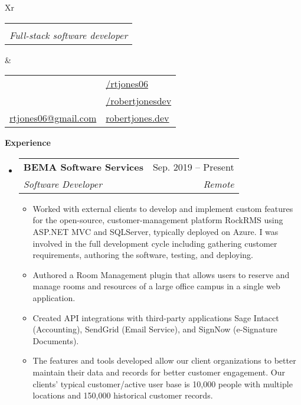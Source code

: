 \documentclass[letterpaper,11.5pt]{article}[leftmargin=*]
\makeatletter
\def \fullname {Robert Jones}
\def \subtitle {Full-stack software developer}
\def \locationicon {\faGlobe}
\def \locationtext {Salt Lake City, Utah}
\def \linkedinicon {\faLinkedin}
\def \linkedinlink {https://linkedin.com/in/rtjones06/}
\def \linkedintext {/rtjones06}
\def \phoneicon {\faPhone}
\def \phonetext {(713) 408-4485}
\def \emailicon {\faEnvelope}
\def \emaillink {mailto:rtjones06@gmail.com}
\def \emailtext {rtjones06@gmail.com}
\def \githubicon {\faGithub}
\def \githublink {https://github.com/robertjonesdev}
\def \githubtext {/robertjonesdev}
\def \websiteicon {\faGlobe}
\def \websitelink {https://robertjones.dev/}
\def \websitetext {robertjones.dev}
\def \headertype {\doublecol} %
\def \entryspacing {-0pt}
\def \linkedin {\linkedinicon \hspace{3pt}\href{\linkedinlink}{\linkedintext}}
\def \phone {\phoneicon \hspace{3pt}{ \phonetext}}
\def \location {\locationicon \hspace{3pt}{ \locationtext }}
\def \email {\emailicon \hspace{3pt}\href{\emaillink}{\emailtext}}
\def \github {\githubicon \hspace{3pt}\href{\githublink}{\githubtext}}
\def \website {\websiteicon \hspace{3pt}\href{\websitelink}{\websitetext}}
\renewcommand{\section}[2]{\vspace{5pt}
  \colorbox{secondary}{\color{white}\raggedbottom\normalsize\textbf{{#1}{\hspace{7pt}#2}}}
}
\newcommand{\resumeEntryStart}{\begin{itemize}[leftmargin=2.5mm]}
\newcommand{\resumeEntryEnd}{\end{itemize}\vspace{\entryspacing}}
\newcommand{\resumeItemListStart}{\begin{itemize}[leftmargin=4.5mm]}
\newcommand{\resumeItemListEnd}{\end{itemize}}
\newcommand{\resumeItem}[1]{
  \item\small{
    {#1 \vspace{-2pt}}
  }
}
\newcommand{\resumeEntryTSDL}[4]{
  \vspace{-1pt}\item[]
    \begin{tabularx}{0.97\textwidth}{X@{\hspace{60pt}}r}
      \textbf{\color{primary}#1} & {\firabook\color{accent}\small#2} \\
      \textit{\color{accent}\small#3} & \textit{\color{accent}\small#4} \\
    \end{tabularx}\vspace{-6pt}
}
\newcommand{\resumeEntryS}[2]{
  \item[]\small{
    \textbf{\color{primary}#1 }{ #2 \vspace{-6pt}}
  }
}
\newcommand{\doublecol}[6]{
  \begin{tabularx}{\textwidth}{Xr}
    {
      \begin{tabular}[c]{l}
        \fontsize{35}{45}\selectfont{\color{primary}{{\textbf{\fullname}}}} \\
        {\textit{\subtitle}} %
      \end{tabular}
    } & {
      \begin{tabular}[c]{l@{\hspace{1.5em}}l}
        {\small#4} & {\small#1} \\
        {\small#5} & {\small#2} \\
        {\small#6} & {\small#3}
      \end{tabular}
    }
  \end{tabularx}
}
\newcommand{\singlecol}[6]{
  \begin{tabularx}{\textwidth}{Xr}
    {
      \begin{tabular}[b]{l}
        \fontsize{35}{45}\selectfont{\color{primary}{{\textbf{\fullname}}}} \\
        {\textit{\subtitle}} %
      \end{tabular}
    } & {
      \begin{tabular}[c]{l}
        {\small#1} \\
        {\small#2} \\
        {\small#3} \\
        {\small#4} \\
        {\small#5} \\
        {\small#6}
      \end{tabular}
    }
  \end{tabularx}
}
\makeatother
\begin{document}


\headertype{\linkedin}{\github}{\website}{\location}{\phone}{\email}{} %
\vspace{0pt} %


\section{\faPieChart}{Experience}

  \resumeEntryStart
    \resumeEntryTSDL
      {BEMA Software Services}{Sep. 2019 -- Present}
      {Software Developer}{Remote}
    \resumeItemListStart
      \resumeItem {Worked with external clients to develop and implement custom features for the open-source, customer-management platform RockRMS using ASP.NET MVC and SQLServer, typically deployed on Azure. I was involved in the full development cycle including gathering customer requirements, authoring the software, testing, and deploying.}
      \resumeItem {Authored a Room Management plugin that allows users to reserve and manage rooms and resources of a large office campus in a single web application.}
      \resumeItem {Created API integrations with third-party applications Sage Intacct (Accounting), SendGrid (Email Service), and SignNow (e-Signature Documents).}
      \resumeItem {The features and tools developed allow our client organizations to better maintain their data and records for better customer engagement. Our clients' typical customer/active user base is 10,000 people with multiple locations and 150,000 historical customer records.}
    \resumeItemListEnd
  \resumeEntryEnd
\end{document}
